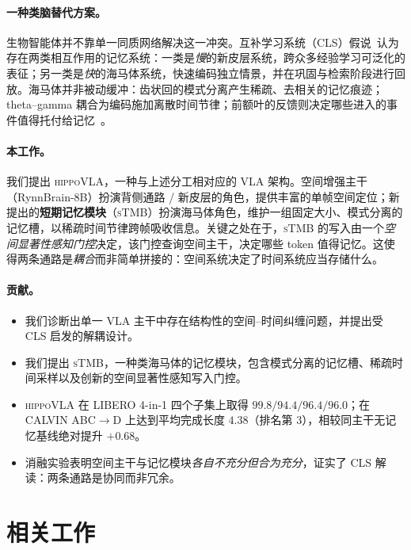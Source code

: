 \documentclass[10pt,letterpaper,fontset=fandol]{ctexart}
\newcommand{\method}{\textsc{hippoVLA}\xspace}
\newcommand{\sTMB}{\textsc{sTMB}\xspace}
\begin{document}
\paragraph{一种类脑替代方案。}
生物智能体并不靠单一同质网络解决这一冲突。互补学习系统（CLS）假说~\citep{mcclelland1995cls,kumaran2016cls}认为存在两类相互作用的记忆系统：一类是\emph{慢}的新皮层系统，跨众多经验学习可泛化的表征；另一类是\emph{快}的海马体系统，快速编码独立情景，并在巩固与检索阶段进行回放。海马体并非被动缓冲：齿状回的模式分离产生稀疏、去相关的记忆痕迹；theta--gamma 耦合为编码施加离散时间节律；前额叶的反馈则决定哪些进入的事件值得托付给记忆~\citep{rolls2013mechanisms}。

\paragraph{本工作。}
我们提出 \method，一种与上述分工相对应的 VLA 架构。空间增强主干（RynnBrain-8B）扮演背侧通路 / 新皮层的角色，提供丰富的单帧空间定位；新提出的\textbf{短期记忆模块}（\sTMB）扮演海马体角色，维护一组固定大小、模式分离的记忆槽，以稀疏时间节律跨帧吸收信息。关键之处在于，\sTMB 的写入由一个\emph{空间显著性感知门控}决定，该门控查询空间主干，决定哪些 token 值得记忆。这使得两条通路是\emph{耦合}而非简单拼接的：空间系统决定了时间系统应当存储什么。

\paragraph{贡献。}
\begin{itemize}[leftmargin=*]
    \item 我们诊断出单一 VLA 主干中存在结构性的空间--时间纠缠问题，并提出受 CLS 启发的解耦设计。
    \item 我们提出 \sTMB，一种类海马体的记忆模块，包含模式分离的记忆槽、稀疏时间采样以及创新的空间显著性感知写入门控。
    \item \method 在 LIBERO 4-in-1 四个子集上取得 $99.8/94.4/96.4/96.0$；在 CALVIN ABC$\rightarrow$D 上达到平均完成长度 $4.38$（排名第 3），相较同主干无记忆基线绝对提升 $+0.68$。
    \item 消融实验表明空间主干与记忆模块\emph{各自不充分但合为充分}，证实了 CLS 解读：两条通路是协同而非冗余。
\end{itemize}

\section{相关工作}
\label{sec:related}
\end{document}
